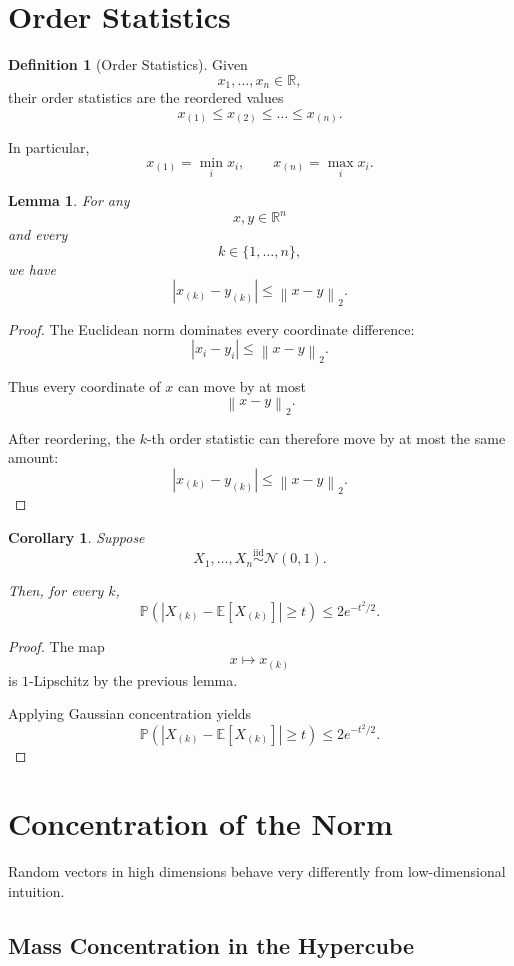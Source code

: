 \documentclass[12pt,oneside]{book}
\numberwithin{equation}{section}
\theoremstyle{definition}
\newtheorem{definition}{Definition}[section]
\theoremstyle{plain}
\newtheorem{lemma}{Lemma}[section]
\newtheorem{corollary}{Corollary}[section]
\theoremstyle{remark}
\newcommand{\R}{\mathbb{R}}
\newcommand{\E}{\mathbb{E}}
\newcommand{\Prob}{\mathbb{P}}
\newcommand{\iid}{\overset{\text{iid}}{\sim}}
\newcommand{\norm}[1]{\left\lVert #1 \right\rVert}
\newcommand{\Normal}{\mathcal{N}}
\begin{document}
\section{Order Statistics}

\begin{definition}[Order Statistics]
Given
\[
x_1,\dots,x_n\in\R,
\]
their order statistics are the reordered values
\[
x_{(1)}
\leq
x_{(2)}
\leq
\dots
\leq
x_{(n)}.
\]
\end{definition}

In particular,
\[
x_{(1)}=\min_i x_i,
\qquad
x_{(n)}=\max_i x_i.
\]

\begin{lemma}
For any
\[
x,y\in\R^n
\]
and every
\[
k\in\{1,\dots,n\},
\]
we have
\[
|x_{(k)}-y_{(k)}|
\leq
\norm{x-y}_2.
\]
\end{lemma}

\begin{proof}
The Euclidean norm dominates every coordinate difference:
\[
|x_i-y_i|
\leq
\norm{x-y}_2.
\]

Thus every coordinate of $x$ can move by at most
\[
\norm{x-y}_2.
\]

After reordering, the $k$-th order statistic can therefore move by at most the same amount:
\[
|x_{(k)}-y_{(k)}|
\leq
\norm{x-y}_2.
\]
\end{proof}

\begin{corollary}
Suppose
\[
X_1,\dots,X_n
\iid
\Normal(0,1).
\]

Then, for every $k$,
\[
\Prob\left(
|X_{(k)}-\E[X_{(k)}]|
\geq t
\right)
\leq
2e^{-t^2/2}.
\]
\end{corollary}

\begin{proof}
The map
\[
x\mapsto x_{(k)}
\]
is $1$-Lipschitz by the previous lemma.

Applying Gaussian concentration yields
\[
\Prob\left(
|X_{(k)}-\E[X_{(k)}]|
\geq t
\right)
\leq
2e^{-t^2/2}.
\]
\end{proof}

\section{Concentration of the Norm}

Random vectors in high dimensions behave very differently from low-dimensional intuition.

\subsection{Mass Concentration in the Hypercube}
\end{document}
